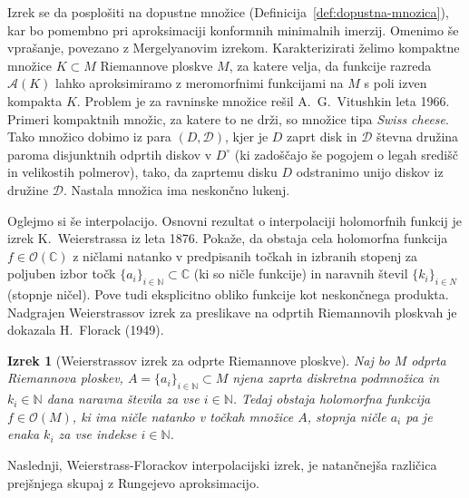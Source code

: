 \documentclass[12pt,a4paper,twoside]{article}
\theoremstyle{definition} %
\theoremstyle{plain} %
\newtheorem{izrek}[definicija]{Izrek}
\numberwithin{equation}{section}  %
\newcommand{\N}{\mathbb N}
\newcommand{\C}{\mathbb C}
\begin{document}
Izrek se da posplošiti na dopustne množice (Definicija~\ref{def:dopustna-mnozica}), kar bo pomembno pri aproksimaciji konformnih minimalnih imerzij. \newline
Omenimo še vprašanje, povezano z Mergelyanovim izrekom. Karakterizirati želimo kompaktne množice $K \subset M$ Riemannove ploskve $M$, za katere velja, da funkcije razreda $\mathcal{A}(K)$ lahko aproksimiramo z meromorfnimi funkcijami na $M$ s poli izven kompakta $K$. Problem je za ravninske množice rešil A.~G.~Vitushkin leta 1966. Primeri kompaktnih množic, za katere to ne drži, so množice tipa \emph{Swiss cheese}. Tako množico dobimo iz para $(D, \mathcal{D})$, kjer je $D$ zaprt disk in $\mathcal{D}$ števna družina paroma disjunktnih odprtih diskov v $D^{\circ}$ (ki zadoščajo še pogojem o legah središč in velikostih polmerov), tako, da zaprtemu disku $D$ odstranimo unijo diskov iz družine $\mathcal{D}$. Nastala množica ima neskončno lukenj. \newline

Oglejmo si še interpolacijo.
Osnovni rezultat o interpolaciji holomorfnih funkcij je izrek K.~Weierstrassa iz leta 1876. Pokaže, da obstaja cela holomorfna funkcija $f \in \mathcal{O}(\C)$ z ničlami natanko v predpisanih točkah in izbranih stopenj za poljuben izbor točk $\{ a_{i} \}_{i \in \N} \subset \C$ (ki so ničle funkcije) in naravnih števil $\{ k_{i} \}_{i \in N}$ (stopnje ničel). Pove tudi eksplicitno obliko funkcije kot neskončnega produkta.
Nadgrajen Weierstrassov izrek za preslikave na odprtih Riemannovih ploskvah je dokazala H.~Florack (1949).

\begin{izrek} [Weierstrassov izrek za odprte Riemannove ploskve] \label{izr:Weierstrass}
Naj bo $M$ odprta Riemannova ploskev, $A = \{a_{i}\}_{i \in \N} \subset M$ njena zaprta diskretna podmnožica in $k_{i} \in \N$ dana naravna števila za vse $i \in \N$.
Tedaj obstaja holomorfna funkcija $f \in \mathcal{O}(M)$, ki ima ničle natanko v točkah množice $A$, stopnja ničle $a_{i}$ pa je enaka $k_{i}$ za vse indekse $i \in \N$.
\end{izrek}

Naslednji, Weierstrass-Florackov interpolacijski izrek, je natančnejša različica prejšnjega skupaj z Rungejevo aproksimacijo.
\end{document}
